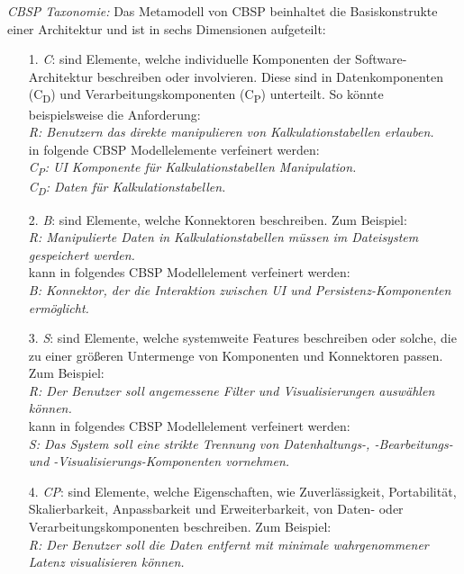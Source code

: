 \emph{CBSP Taxonomie:}
Das Metamodell von CBSP beinhaltet die Basiskonstrukte einer Architektur und ist in sechs Dimensionen aufgeteilt: \\

\begin{itemize}
\item[1.] \textit{C}: sind Elemente, welche individuelle Komponenten der Software-Architektur beschreiben oder involvieren. Diese sind in Datenkomponenten (C\textsubscript{D}) und Verarbeitungskomponenten (C\textsubscript{P}) unterteilt. So k\"onnte beispielsweise die Anforderung: \\
	\textit{R: Benutzern das direkte manipulieren von Kalkulationstabellen erlauben.} \\
	in folgende CBSP Modellelemente verfeinert werden: \\
	\textit{C\textsubscript{P}: UI Komponente f\"ur Kalkulationstabellen Manipulation.} \\
	\textit{C\textsubscript{D}: Daten f\"ur Kalkulationstabellen.}  \cite{Gru01}
\item[2.] \textit{B}: sind Elemente, welche Konnektoren beschreiben. Zum Beispiel: \\
	\textit{R: Manipulierte Daten in Kalkulationstabellen müssen im Dateisystem gespeichert werden.} \\
	kann in folgendes CBSP Modellelement verfeinert werden: \\
	\textit{B: Konnektor, der die Interaktion zwischen UI und Persistenz-Komponenten erm\"oglicht.} \cite{Gru01}
\item[3.] \textit{S}: sind Elemente, welche systemweite Features beschreiben oder solche, die zu einer gr\"o\ss{}eren Untermenge von Komponenten und Konnektoren passen. Zum Beispiel: \\
	\textit{R: Der Benutzer soll angemessene Filter und Visualisierungen ausw\"ahlen k\"onnen.} \\
	kann in folgendes CBSP Modellelement verfeinert werden: \\
	\textit{S: Das System soll eine strikte Trennung von Datenhaltungs-, -Bearbeitungs- und -Visualisierungs-Komponenten vornehmen.} \cite{Gru01}
\item[4.] \textit{CP}: sind Elemente, welche Eigenschaften, wie Zuverl\"assigkeit, Portabilit\"at, Skalierbarkeit, Anpassbarkeit und Erweiterbarkeit, von Daten- oder Verarbeitungskomponenten beschreiben. Zum Beispiel: \\
	\textit{R: Der Benutzer soll die Daten entfernt mit minimale wahrgenommener Latenz visualisieren k\"onnen.} \\

\end{itemize}
